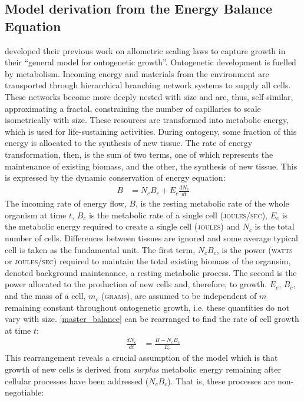 \documentclass[a4paper]{article} %
\begin{document}
\subsection{Model derivation from the Energy Balance Equation}
\textcite{West2001} developed their previous work on allometric scaling laws \autocite{West1997} to capture growth in their ``general model for ontogenetic growth''. Ontogenetic development is fuelled by metabolism. Incoming energy and materials from the environment are transported through hierarchical branching network systems to supply all cells. These networks become more deeply nested with size and are, thus, self-similar, approximating a fractal, constraining the number of capillaries to scale isometrically with size. These resources are transformed into metabolic energy, which is used for life-sustaining activities. During ontogeny, some fraction of this energy is allocated to the synthesis of new tissue. The rate of energy transformation, then, is the sum of two terms, one of which represents the maintenance of existing biomass, and the other, the synthesis of new tissue. This is expressed by the dynamic conservation of energy equation:
\begin{align}
    B &= N_{c}B_{c} + E_{c}\frac{dN_{c}}{dt} \label{master_balance}
\end{align}
The incoming rate of energy flow, $B$, is the resting metabolic rate of the whole organism at time $t$, $B_c$ is the metabolic rate of a single cell (\textsc{joules/sec}), $E_c$ is the metabolic energy required to create a single cell (\textsc{joules}) and $N_c$ is the total number of cells. Differences between tissues are ignored and some average typical cell is taken as the fundamental unit. The first term, $N_{c}B_{c}$, is the power (\textsc{watts} or \textsc{joules/sec}) required to maintain the total existing biomass of the organsim, denoted background maintenance, a resting metabolic process. The second is the power allocated to the production of new cells and, therefore, to growth. $E_c$, $B_c$, and the mass of a cell, $m_c$ (\textsc{grams}), are assumed to be independent of $m$ remaining constant throughout ontogenetic growth, i.e. these quantities do not vary with size. \cref{master_balance} can be rearranged to find the rate of cell growth at time $t$: 
\begin{align}
    \frac{dN_{c}}{dt} &= \frac{B - N_{c}B_{c}}{E_{c}} \label{cell_rate}
\end{align}
This rearrangement reveals a crucial assumption of the model which is that growth of new cells is derived from \textit{surplus} metabolic energy remaining after cellular processes have been addressed ($N_{c}B_{c}$). That is, these processes are non-negotiable:
\end{document}
